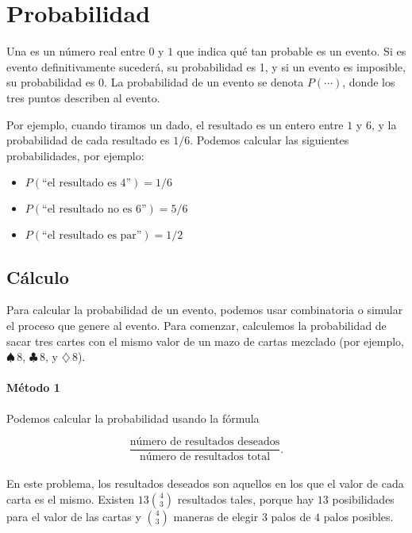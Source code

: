 \chapter{Probabilidad}


Una  es un número real entre $0$ y $1$ que indica qué
tan probable es un evento. Si es evento definitivamente sucederá, su
probabilidad es 1, y si un evento es imposible, su probabilidad es 0.
La probabilidad de un evento se denota $P(\cdots)$, donde los tres
puntos describen al evento.

Por ejemplo, cuando tiramos un dado, el resultado es un entero entre
$1$ y $6$, y la probabilidad de cada resultado es $1/6$. Podemos calcular
las siguientes probabilidades, por ejemplo:

\begin{itemize}[noitemsep]
    \item $P(\textrm{``el resultado es 4''})=1/6$
    \item $P(\textrm{``el resultado no es 6''})=5/6$
    \item $P(\textrm{``el resultado es par''})=1/2$
\end{itemize}

\section{Cálculo}

Para calcular la probabilidad de un evento, podemos usar combinatoria o
simular el proceso que genere al evento. Para comenzar, calculemos la
probabilidad de sacar tres cartes con el mismo valor de un mazo de cartas
mezclado (por ejemplo, $\spadesuit\,8$, $\clubsuit\,8$, y $\diamondsuit\,8$).

\subsubsection*{Método 1}

Podemos calcular la probabilidad usando la fórmula

\[\frac{\textrm{número de resultados deseados}}{\textrm{número de resultados total}}.\]
\\
En este problema, los resultados deseados son aquellos en los que el valor
de cada carta es el mismo. Existen $13 \binom{4}{3}$ resultados tales,
porque hay $13$ posibilidades para el valor de las cartas y $\binom{4}{3}$
maneras de elegir $3$ palos de $4$ palos posibles.

